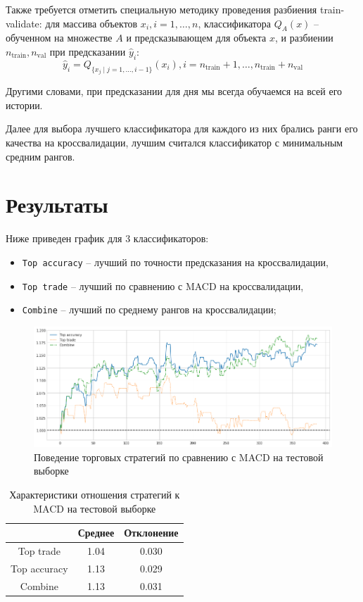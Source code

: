 \documentclass[pdftex,ptm,14pt,a4paper]{report}
\begin{document}
Также требуется отметить специальную методику проведения разбиения train-validate: для массива объектов $x_i, i=1,\ldots,n$, классификатора $Q_A(x)$ -- обученном на множестве $A$ и предсказывающем для объекта $x$, 
и разбиении $n_\text{train}, n_\text{val}$ при предсказании $\hat{y}_i$:
\[ \hat{y}_i = Q_{\{x_j \mid j=1,\ldots,i-1\}}(x_i), i=n_\text{train}+1,\ldots,n_\text{train} + n_\text{val} \]

Другими словами, при предсказании для дня мы всегда обучаемся на всей его истории.

Далее для выбора лучшего классификатора для каждого из них брались ранги его качества на кроссвалидации, лучшим
считался классификатор с минимальным средним рангов.

\section{Результаты}

Ниже приведен график для 3 классификаторов:

\begin{itemize}
\item \texttt{Top accuracy} -- лучший по точности предсказания на кроссвалидации,
\item \texttt{Top trade} -- лучший по сравнению с MACD на кроссвалидации,
\item \texttt{Combine} -- лучший по среднему рангов на кроссвалидации;
\end{itemize}

\begin{figure}[h]
\includegraphics[width=\linewidth]{vs_macd_on_test}
\caption{Поведение торговых стратегий по сравнению с MACD на тестовой выборке}
\end{figure}

\begin{table}[h]
\centering
\begin{tabular}{| c | c | c |}
\hline
 & Среднее & Отклонение \\ \hline
Top trade & 1.04 & 0.030 \\ \hline
Top accuracy & 1.13 & 0.029 \\ \hline
Combine & 1.13 & 0.031 \\ \hline
\end{tabular}
\caption{Характеристики отношения стратегий к MACD на тестовой выборке}
\end{table}
\end{document}
